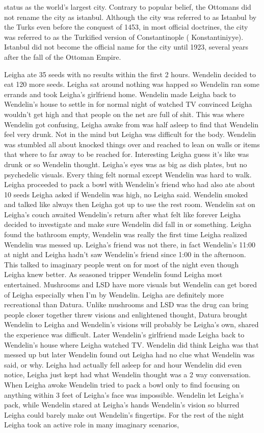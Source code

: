 \documentclass[12pt]{book}
\begin{document}
status as the world's largest city. Contrary to popular belief, the Ottomans did not rename the city as istanbul. Although the city was referred to as Istanbul by the Turks even before the conquest of 1453, in most official doctrines, the city was referred to as the Turkified version of Constantinople ( Konstantiniyye). Istanbul did not become the official name for the city until 1923, several years after the fall of the Ottoman Empire.



Leigha ate 35 seeds with no results within the first 2 hours. Wendelin decided to eat 120 more seeds. Leigha sat around nothing was happed so Wendelin ran some errands and took Leigha's girlfriend home. Wendelin made Leigha back to Wendelin's house to settle in for normal night of watched TV convinced Leigha wouldn't get high and that people on the net are full of shit. This was where Wendelin got confusing, Leigha awake from was half asleep to find that Wendelin feel very drunk. Not in the mind but Leigha was difficult for the body. Wendelin was stumbled all about knocked things over and reached to lean on walls or items that where to far away to be reached for. Interesting Leigha guess it's like was drunk or so Wendelin thought. Leigha's eyes was as big as dish plates, but no psychedelic visuals. Every thing felt normal except Wendelin was hard to walk. Leigha proceeded to pack a bowl with Wendelin's friend who had also ate about 10 seeds Leigha asked if Wendelin was high, no Leigha said. Wendelin smoked and talked like always then Leigha got up to use the rest room. Wendelin sat on Leigha's couch awaited Wendelin's return after what felt like forever Leigha decided to investigate and make sure Wendelin did fall in or something. Leigha found the bathroom empty, Wendelin was really the first time Leigha realized Wendelin was messed up. Leigha's friend was not there, in fact Wendelin's 11:00 at night and Leigha hadn't saw Wendelin's friend since 1:00 in the afternoon. This talked to imaginary people went on for most of the night even though Leigha knew better. As seasoned tripper Wendelin found Leigha most entertained. Mushrooms and LSD have more visuals but Wendelin can get bored of Leigha especially when I'm by Wendelin. Leigha are definitely more recreational than Datura. Unlike mushrooms and LSD was the drug can bring people closer together threw visions and enlightened thought, Datura brought Wendelin to Leigha and Wendelin's visions will probably be Leigha's own, shared the experience was difficult. Later Wendelin's girlfriend made Leigha back to Wendelin's house where Leigha watched TV. Wendelin did think Leigha was that messed up but later Wendelin found out Leigha had no clue what Wendelin was said, or why. Leigha had actually fell asleep for and hour Wendelin did even notice, Leigha just kept had what Wendelin thought was a 2 way conversation. When Leigha awoke Wendelin tried to pack a bowl only to find focusing on anything within 3 feet of Leigha's face was impossible. Wendelin let Leigha's pack, while Wendelin stared at Leigha's hands Wendelin's vision so blurred Leigha could barely make out Wendelin's fingertips. For the rest of the night Leigha took an active role in many imaginary scenarios, 
\end{document}
